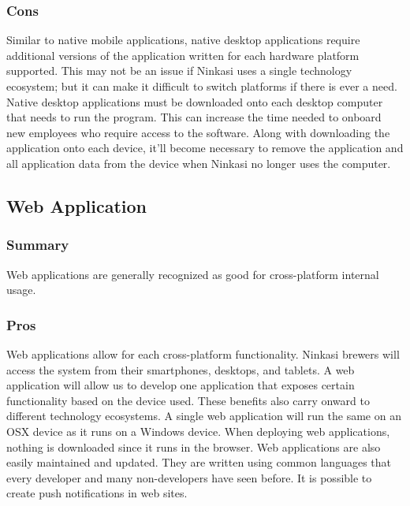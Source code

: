 \documentclass[draftclsnofoot,onecolumn,letterpaper,10pt,compsoc]{IEEEtran}
\begin{document}
        \subsubsection{Cons}
            Similar to native mobile applications, native desktop applications require additional versions of the application written for each hardware platform supported.
            This may not be an issue if Ninkasi uses a single technology ecosystem; but it can make it difficult to switch platforms if there is ever a need.
            Native desktop applications must be downloaded onto each desktop computer that needs to run the program.
            This can increase the time needed to onboard new employees who require access to the software.
            Along with downloading the application onto each device, it'll become necessary to remove the application and all application data from the device when Ninkasi no longer uses the computer.
    
    
	\subsection{Web Application}
        \subsubsection{Summary}
            Web applications are generally recognized as good for cross-platform internal usage\cite{SearchCloudOverview}.
    
        \subsubsection{Pros}
            Web applications allow for each cross-platform functionality.
            Ninkasi brewers will access the system from their smartphones, desktops, and tablets.
            A web application will allow us to develop one application that exposes certain functionality based on the device used.
            These benefits also carry onward to different technology ecosystems.
            A single web application will run the same on an OSX device as it runs on a Windows device.
            When deploying web applications, nothing is downloaded since it runs in the browser.
            Web applications are also easily maintained and updated.
            They are written using common languages that every developer and many non-developers have seen before.
            It is possible to create push notifications in web sites\cite{GooglePushNotifications}.
    
\end{document}
